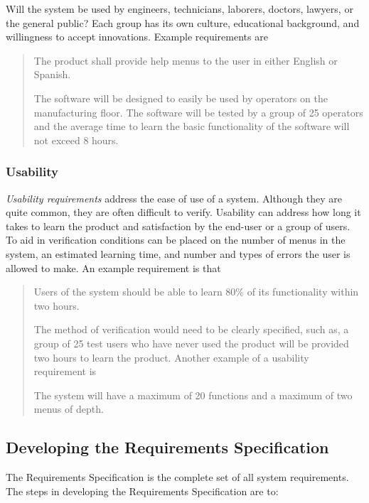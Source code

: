 Will the system be used by engineers, technicians, laborers, doctors,
lawyers, or the general public? Each group has its own culture,
educational background, and willingness to accept innovations. Example
requirements are

\begin{quote}
The product shall provide help menus to the user in either English or
Spanish.

The software will be designed to easily be used by operators on the
manufacturing floor. The software will be tested by a group of 25
operators and the average time to learn the basic functionality of the
software will not exceed 8 hours.
\end{quote}

\subsubsection*{\texorpdfstring{Usability
}{Usability }}\label{usability}

\emph{Usability requirements} address the ease of use of a system.
Although they are quite common, they are often difficult to verify.
Usability can address how long it takes to learn the product and
satisfaction by the end-user or a group of users. To aid in verification
conditions can be placed on the number of menus in the system, an
estimated learning time, and number and types of errors the user is
allowed to make. An example requirement is that

\begin{quote}
Users of the system should be able to learn 80\% of its functionality
within two hours.

The method of verification would need to be clearly specified, such as,
a group of 25 test users who have never used the product will be
provided two hours to learn the product. Another example of a usability
requirement is

The system will have a maximum of 20 functions and a maximum of two
menus of depth.
\end{quote}

\subsection{Developing the Requirements
Specification}\label{developing-the-requirements-specification}

The Requirements Specification is the complete set of all system
requirements. The steps in developing the Requirements Specification are
to:


